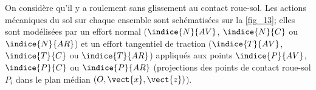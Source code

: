 %
%
%
%
%
%
%


On considère qu'il y a roulement sans glissement au contact roue-sol. Les actions mécaniques du
sol sur chaque ensemble sont schématisées sur la \autoref{fig_13}; elles sont modélisées par un effort
normal ($\indice{N}{AV}$, $\indice{N}{C}$ ou $\indice{N}{AR}$) et un effort tangentiel de traction ($\indice{T}{AV}$, $\indice{T}{C}$ ou $\indice{T}{AR}$) appliqués aux
points $\indice{P}{AV}$, $\indice{P}{C}$ ou $\indice{P}{AR}$ (projections des points de contact roue-sol $P_i$ dans le plan médian $\left(O,\vect{x},\vect{z}\right)$).

